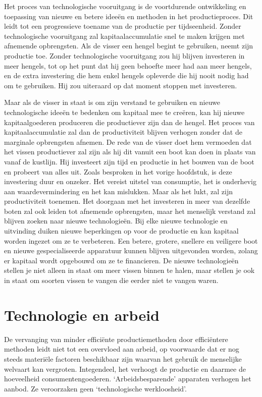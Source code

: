 \documentclass[
  a5paper,
  smalldemyvopaper,11pt,twoside,onecolumn,openright,extrafontsizes,
hidelinks]{memoir}
\begin{document}
Het proces van technologische vooruitgang is de voortdurende
ontwikkeling en toepassing van nieuwe en betere ideeën en methoden in
het productieproces. Dit leidt tot een progressieve toename van de
productie per tijdseenheid. Zonder technologische vooruitgang zal
kapitaalaccumulatie snel te maken krijgen met afnemende opbrengsten. Als
de visser een hengel begint te gebruiken, neemt zijn productie toe.
Zonder technologische vooruitgang zou hij blijven investeren in meer
hengels, tot op het punt dat hij geen behoefte meer had aan meer
hengels, en de extra investering die hem enkel hengels opleverde die hij
nooit nodig had om te gebruiken. Hij zou uiteraard op dat moment stoppen
met investeren.

Maar als de visser in staat is om zijn verstand te gebruiken en nieuwe
technologische ideeën te bedenken om kapitaal mee te creëren, kan hij
nieuwe kapitaalgoederen produceren die productiever zijn dan de hengel.
Het proces van kapitaalaccumulatie zal dan de productiviteit blijven
verhogen zonder dat de marginale opbrengsten afnemen. De rede van de
visser doet hem vermoeden dat het vissen productiever zal zijn als hij
dit vanuit een boot kan doen in plaats van vanaf de kustlijn. Hij
investeert zijn tijd en productie in het bouwen van de boot en probeert
van alles uit. Zoals besproken in het vorige hoofdstuk, is deze
investering duur en onzeker. Het vereist uitstel van consumptie, het is
onderhevig aan waardevermindering en het kan mislukken. Maar als het
lukt, zal zijn productiviteit toenemen. Het doorgaan met het investeren
in meer van dezelfde boten zal ook leiden tot afnemende opbrengsten,
maar het menselijk verstand zal blijven zoeken naar nieuwe
technologieën. Bij elke nieuwe technologie en uitvinding duiken nieuwe
beperkingen op voor de productie en kan kapitaal worden ingezet om ze te
verbeteren. Een betere, grotere, snellere en veiligere boot en nieuwe
gespecialiseerde apparatuur kunnen blijven uitgevonden worden, zolang er
kapitaal wordt opgebouwd om ze te financieren. De nieuwe technologieën
stellen je niet alleen in staat om meer vissen binnen te halen, maar
stellen je ook in staat om soorten vissen te vangen die eerder niet te
vangen waren.

\section{Technologie en arbeid}\label{technologie-en-arbeid}

De vervanging van minder efficiënte productiemethoden door efficiëntere
methoden leidt niet tot een overvloed aan arbeid, op voorwaarde dat er
nog steeds materiële factoren beschikbaar zijn waarvan het gebruik de
menselijke welvaart kan vergroten. Integendeel, het verhoogt de
productie en daarmee de hoeveelheid consumentengoederen.
`Arbeidsbesparende' apparaten verhogen het aanbod. Ze veroorzaken geen
`technologische werkloosheid'.
\end{document}
